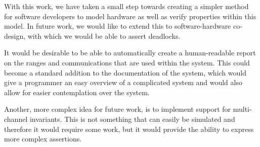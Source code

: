 With this work, we have taken a small step towards creating a simpler method for software developers to model hardware as well as verify properties within this model. In future work, we would like to extend this to software-hardware co-design, with which we would be able to assert deadlocks.

It would be desirable to be able to automatically create a human-readable report on the ranges and communications that are used within the system. This could become a standard addition to the documentation of the system, which would give a programmer an easy overview of a complicated system and would also allow for easier contemplation over the system.

Another, more complex idea for future work, is to implement support for multi-channel invariants. This is not something that can easily be simulated and therefore it would require some work, but it would provide the ability to express more complex assertions.


